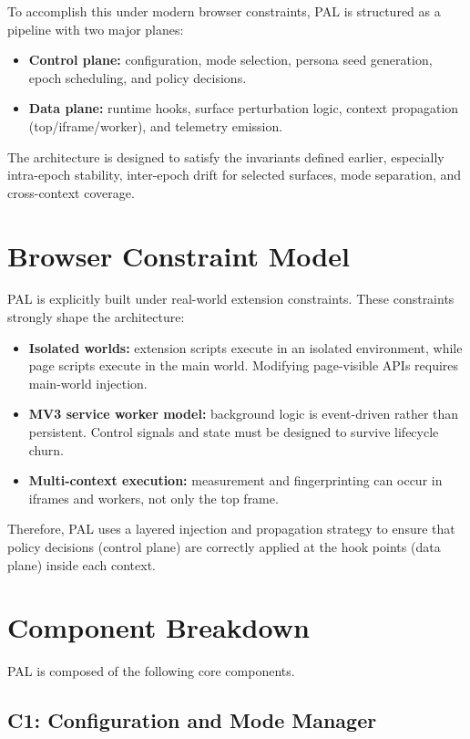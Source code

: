 \documentclass[11pt]{report}
\begin{document}
To accomplish this under modern browser constraints, PAL is structured as a pipeline with two major planes:

\begin{itemize}
    \item \textbf{Control plane:} configuration, mode selection, persona seed generation, epoch scheduling, and policy decisions.
    \item \textbf{Data plane:} runtime hooks, surface perturbation logic, context propagation (top/iframe/worker), and telemetry emission.
\end{itemize}

The architecture is designed to satisfy the invariants defined earlier, especially intra-epoch stability, inter-epoch drift for selected surfaces, mode separation, and cross-context coverage.

\section{Browser Constraint Model}

PAL is explicitly built under real-world extension constraints. These constraints strongly shape the architecture:

\begin{itemize}
    \item \textbf{Isolated worlds:} extension scripts execute in an isolated environment, while page scripts execute in the main world. Modifying page-visible APIs requires main-world injection.
    \item \textbf{MV3 service worker model:} background logic is event-driven rather than persistent. Control signals and state must be designed to survive lifecycle churn.
    \item \textbf{Multi-context execution:} measurement and fingerprinting can occur in iframes and workers, not only the top frame.
\end{itemize}

Therefore, PAL uses a layered injection and propagation strategy to ensure that policy decisions (control plane) are correctly applied at the hook points (data plane) inside each context.

\section{Component Breakdown}

PAL is composed of the following core components.

\subsection{C1: Configuration and Mode Manager}
\end{document}
